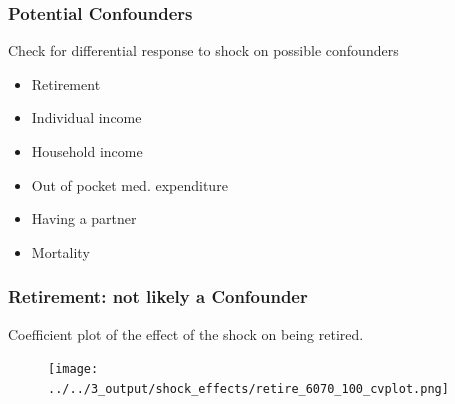 \documentclass[10pt,compress,xcolor=dvipsnames]{beamer}    %
\newcounter{ex}
\newcommand{\1}[1]{\mathrm{1\hspace*{-2.5pt}l}[#1]}	%
\begin{document}
\begin{frame}
\frametitle{Potential Confounders}
\label{frame:Confounders}
Check for differential response to shock on possible confounders \cite{Pei2018}
\begin{itemize}
	\item Retirement 		\hyperlink{fig:retire}{\beamergotobutton{}}
	\item Individual income \hyperlink{fig:wage}{\beamergotobutton{}}
	\item Household income	\hyperlink{fig:hhinc}{\beamergotobutton{}}
	\item Out of pocket med. expenditure   \hyperlink{fig:oome}{\beamergotobutton{}}
	\item Having a partner	\hyperlink{fig:mpart}{\beamergotobutton{}}
	\item Mortality \hyperlink{fig:dead2}{} \hyperlink{fig:dead5}{}
\end{itemize}

\end{frame}

\begin{frame}
\frametitle{Retirement: not likely a Confounder}
Coefficient plot of the effect of the shock on being retired.
\begin{figure}[hbtp]
\centering
\texttt{[image: ../../3\_output/shock\_effects/retire\_6070\_100\_cvplot.png]}
\label{fig:retire}
\end{figure}
\end{frame}
\end{document}
